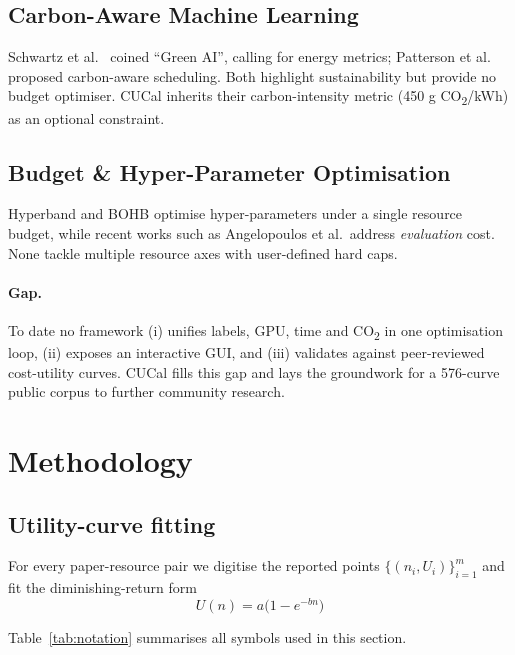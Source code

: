 \documentclass[11pt]{article}
\begin{document}
\subsection{Carbon-Aware Machine Learning}
Schwartz et al.~\citeyearpar{Schwartz2020} coined “Green AI”, calling for
energy metrics; Patterson et al.~\citeyearpar{Patterson2022} proposed
carbon-aware scheduling.  Both highlight sustainability but provide no
budget optimiser.  CUCal inherits their carbon-intensity metric
(450 g CO\textsubscript{2}/kWh) as an optional constraint.

\subsection{Budget \& Hyper-Parameter Optimisation}
Hyperband \citep{Li2017hyperband} and BOHB \citep{Falkner2018bohb}
optimise hyper-parameters under a single resource budget, while recent
works such as Angelopoulos et al.\ address \emph{evaluation} cost.
None tackle multiple resource axes with user-defined hard caps.

\paragraph{Gap.}
To date no framework (i) unifies labels, GPU, time and
CO\textsubscript{2} in one optimisation loop, (ii) exposes an interactive
GUI, and (iii) validates against peer-reviewed cost-utility curves.
CUCal fills this gap and lays the groundwork for a 576-curve public corpus
to further community research.

\section{Methodology}\label{sec:methodology}

\subsection{Utility-curve fitting}\label{sec:method:fit}
For every paper-resource pair we digitise the reported points
\(\{(n_i,U_i)\}_{i=1}^{m}\)%
\allowbreak and fit the diminishing-return form
\[
  U(n)=a\bigl(1-e^{-bn}\bigr)
\]

Table~\ref{tab:notation} summarises all symbols used in this section.
\end{document}
